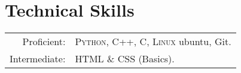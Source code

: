 \documentclass[a4paper,10pt]{article}
\begin{document}
\section{Technical Skills}
\begin{tabular}{rl}
 Proficient:& \textsc{Python}, \textsc{C++}, \textsc{C}, \textsc{Linux} ubuntu, Git.\\
Intermediate:& HTML \& CSS (Basics).\\
\end{tabular}


		
		
\end{document}
